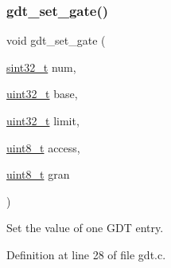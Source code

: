 \subsubsection{\texorpdfstring{gdt\+\_\+set\+\_\+gate()}{gdt\_set\_gate()}}
{\footnotesize\ttfamily void gdt\+\_\+set\+\_\+gate (\begin{DoxyParamCaption}\item[{\hyperlink{a00092_ad838970452fe561cb8e0550cac5336be_ad838970452fe561cb8e0550cac5336be}{sint32\+\_\+t}}]{num,  }\item[{\hyperlink{a00092_a435d1572bf3f880d55459d9805097f62_a435d1572bf3f880d55459d9805097f62}{uint32\+\_\+t}}]{base,  }\item[{\hyperlink{a00092_a435d1572bf3f880d55459d9805097f62_a435d1572bf3f880d55459d9805097f62}{uint32\+\_\+t}}]{limit,  }\item[{\hyperlink{a00092_aba7bc1797add20fe3efdf37ced1182c5_aba7bc1797add20fe3efdf37ced1182c5}{uint8\+\_\+t}}]{access,  }\item[{\hyperlink{a00092_aba7bc1797add20fe3efdf37ced1182c5_aba7bc1797add20fe3efdf37ced1182c5}{uint8\+\_\+t}}]{gran }\end{DoxyParamCaption})}



Set the value of one G\+DT entry. 



Definition at line 28 of file gdt.\+c.


